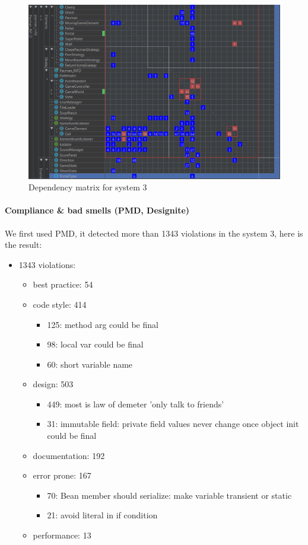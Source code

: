 \documentclass[]{article}
\begin{document}
\begin{figure}[h!]
\centering
\includegraphics[width=0.8\linewidth]{dependencyM.png}
\caption{Dependency matrix for system 3}
\label{fig:S3_dep_matrix}
\end{figure}

\newpage

\paragraph{Compliance \& bad smells (PMD, Designite)}

We first used PMD, it detected more than 1343 violations in the system 3, here is the result:
\begin{itemize}
    \item 1343 violations: 
    \begin{itemize}
        \item best practice: 54
        \item code style: 414
         \begin{itemize}
            \item 125: method arg could be final 
            \item 98: local var could be final
            \item 60: short variable name
        \end{itemize}
        \item design: 503
        \begin{itemize}
            \item 449: most is law of demeter 'only talk to friends'  
            \item 31: immutable field: private field values never change once object init could be 			                   final
        \end{itemize}
        \item documentation: 192
        \item error prone: 167
        \begin{itemize}
            \item 70: Bean member should serialize: make variable transient or static
            \item 21: avoid literal in if condition
        \end{itemize}
        \item performance: 13
    \end{itemize}
\end{itemize}
		
\end{document}
